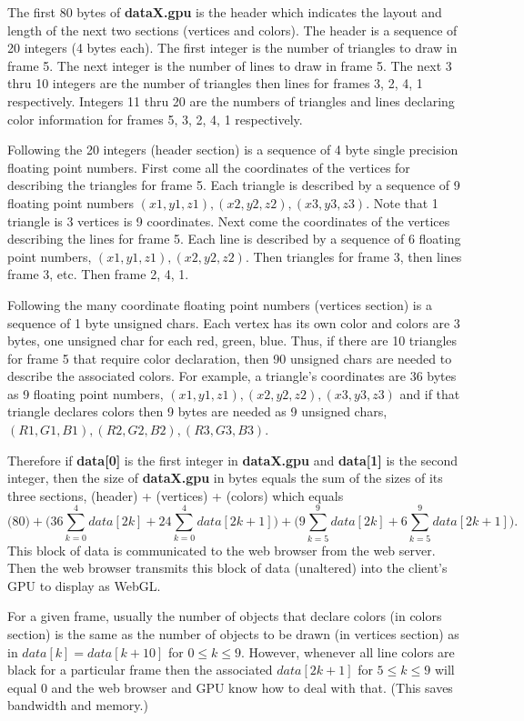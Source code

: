The first 80 bytes of \textbf{dataX.gpu} is the header which indicates the layout and length of the next two sections (vertices and colors).
The header is a sequence of 20 integers (4 bytes each). The first integer is the number of triangles
to draw in frame 5. The next integer is the number of lines to draw in frame 5.
The next 3 thru 10 integers are the number of triangles then lines for frames 3, 2, 4, 1 respectively. 
Integers 11 thru 20 are the numbers of triangles and lines declaring color information for frames 5, 3, 2, 4, 1 respectively.

Following the 20 integers (header section) is a sequence of 4 byte single precision floating point numbers. First come all the coordinates of the vertices for describing 
the triangles for frame 5. Each triangle is described by a sequence of 9 floating point numbers $(x1,y1,z1), (x2,y2,z2), (x3,y3,z3)$. 
Note that 1 triangle is 3 vertices is 9 coordinates.
Next come the coordinates of the vertices describing the lines for frame 5. Each line is described by a sequence of 6 floating point numbers,
$(x1,y1,z1), (x2,y2,z2)$.
Then triangles for frame 3, then lines frame 3, etc. Then frame 2, 4, 1.
 
Following the many coordinate floating point numbers (vertices section) is a sequence of 1 byte unsigned chars.
Each vertex has its own color and colors are 3 bytes, one unsigned char for each red, green, blue. Thus, if there 
are 10 triangles for frame 5 that require color declaration, then 90 unsigned chars are needed to describe the associated colors.
For example, a triangle's coordinates are 36 bytes as 9 floating point numbers, $(x1,y1,z1), (x2,y2,z2), (x3,y3,z3)$ 
and if that triangle declares colors then 9 bytes are needed as 9 unsigned chars, $(R1,G1,B1), (R2,G2,B2), (R3,G3,B3)$.

Therefore if \textbf{data[0]} is the first integer in \textbf{dataX.gpu} and \textbf{data[1]} is the second integer, then the size of \textbf{dataX.gpu}
in bytes equals the sum of the sizes of its three sections, (header) + (vertices) + (colors) which equals\\ 
$$\bigg(80\bigg) + \bigg(36 \sum_{k=0}^{4}data[2k] + 24 \sum_{k=0}^{4}data[2k +1]\bigg) + \bigg(9 \sum_{k=5}^{9}data[2k] + 6 \sum_{k=5}^{9}data[2k +1]\bigg).$$
This block of data is communicated to the web browser from
the web server. Then the web browser transmits this block of data (unaltered) into the client's GPU to display as WebGL.

For a given frame, usually the number of objects that declare colors (in colors section) is the same as the number of objects to 
be drawn (in vertices section) as in $data[k]=data[k+10]$ for $0\leq k \leq 9$. 
However, whenever all line colors are black for a particular frame then the associated $data[2k+1]$ for $5 \leq k \leq 9$ will equal 0
and the web browser and GPU know how to deal with that. (This saves bandwidth and memory.)

